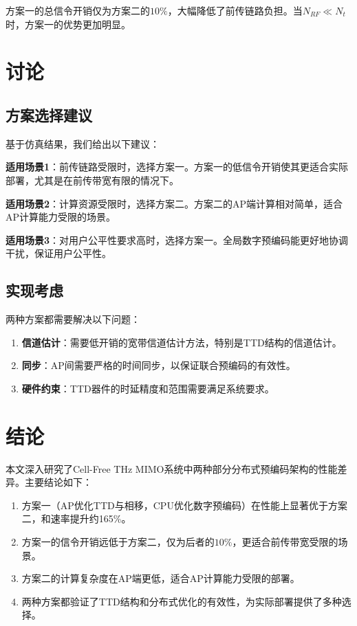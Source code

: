 \documentclass[10pt,twocolumn]{IEEEtran}
\begin{document}
方案一的总信令开销仅为方案二的$10\%$，大幅降低了前传链路负担。当$N_{RF} \ll N_t$时，方案一的优势更加明显。

\section{讨论}

\subsection{方案选择建议}

基于仿真结果，我们给出以下建议：

\textbf{适用场景1}：前传链路受限时，选择方案一。方案一的低信令开销使其更适合实际部署，尤其是在前传带宽有限的情况下。

\textbf{适用场景2}：计算资源受限时，选择方案二。方案二的AP端计算相对简单，适合AP计算能力受限的场景。

\textbf{适用场景3}：对用户公平性要求高时，选择方案一。全局数字预编码能更好地协调干扰，保证用户公平性。

\subsection{实现考虑}

两种方案都需要解决以下问题：

\begin{enumerate}
\item \textbf{信道估计}：需要低开销的宽带信道估计方法，特别是TTD结构的信道估计。
\item \textbf{同步}：AP间需要严格的时间同步，以保证联合预编码的有效性。
\item \textbf{硬件约束}：TTD器件的时延精度和范围需要满足系统要求。
\end{enumerate}

\section{结论}

本文深入研究了Cell-Free THz MIMO系统中两种部分分布式预编码架构的性能差异。主要结论如下：

\begin{enumerate}
\item 方案一（AP优化TTD与相移，CPU优化数字预编码）在性能上显著优于方案二，和速率提升约165\%。
\item 方案一的信令开销远低于方案二，仅为后者的$10\%$，更适合前传带宽受限的场景。
\item 方案二的计算复杂度在AP端更低，适合AP计算能力受限的部署。
\item 两种方案都验证了TTD结构和分布式优化的有效性，为实际部署提供了多种选择。
\end{enumerate}
\end{document}
